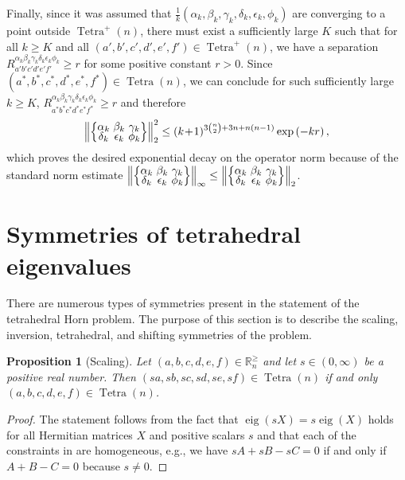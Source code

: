 \documentclass[notitlepage, 11pt, letterpaper]{amsart}
\theoremstyle{plain}
\newtheorem{prop}[thm]{Proposition}
\theoremstyle{definition}
\let\cref\crtcref
\DeclareMathOperator{\Tetra}{Tetra}
\DeclareMathOperator{\eig}{eig}
\newcommand{\polyk}[1]{(k\!+\!1)^{#1}}
\newcommand{\norm}[1]{\left\lVert#1\right\rVert}
\newcommand{\eigs}[1]{\mathbb R^{\geq}_{#1}}
\newcommand{\ea}{a}
\newcommand{\eb}{b}
\newcommand{\ec}{c}
\newcommand{\ed}{d}
\newcommand{\ee}{e}
\newcommand{\ef}{f}
\newcommand{\ya}{\alpha}
\newcommand{\yb}{\beta}
\newcommand{\yc}{\gamma}
\newcommand{\yd}{\delta}
\newcommand{\ye}{\epsilon}
\newcommand{\yf}{\phi}
\newcommand{\tightcurlysixj}[1]{
\begingroup
\arraycolsep=1.5pt
\renewcommand{\arraystretch}{0.3}
\left\{\!\begin{array}{ccc}
    #1
\end{array}\!\right\}
\endgroup
}
\newcommand{\abcdefsymbolk}{\tightcurlysixj{\alpha_k & \beta_k & \gamma_k \\ \delta_k & \epsilon_k & \phi_k}}
\begin{document}
Finally, since it was assumed that $\frac{1}{k}(\ya_k,\yb_k,\yc_k,\yd_k,\ye_k,\yf_k)$ are converging to a point outside $\Tetra^{+}(n)$, there must exist a sufficiently large $K$ such that for all $k \geq K$ and all $(\ea',\eb',\ec',\ed',\ee',\ef') \in \Tetra^{+}(n)$, we have a separation $R_{\ea'\eb'\ec'\ed'\ee'\ef'}^{\ya_k\yb_k\yc_k\yd_k\ye_k\yf_k} \geq r$ for some positive constant $r > 0$.
Since $(\ea^{*},\eb^{*},\ec^{*},\ed^{*},\ee^{*},\ef^{*}) \in \Tetra(n)$, we can conclude for such sufficiently large $k \geq K$, $R_{\ea^{*}\eb^{*}\ec^{*}\ed^{*}\ee^{*}\ef^{*}}^{\ya_k\yb_k\yc_k\yd_k\ye_k\yf_k} \geq r$ and therefore
\begin{equation}
    \norm{\abcdefsymbolk}_{2}^{2} \leq \polyk{3\binom{n}{2}+3n + n(n-1)}  \exp\left( - k r\right),
\end{equation}
which proves the desired exponential decay on the operator norm because of the standard norm estimate $\norm{\abcdefsymbolk}_{\infty} \leq \norm{\abcdefsymbolk}_{2}$.

\appendix

\section{Symmetries of tetrahedral eigenvalues}
\label{sec:symmetries}

There are numerous types of symmetries present in the statement of the tetrahedral Horn problem.
The purpose of this section is to describe the scaling, inversion, tetrahedral, and shifting symmetries of the problem.

\begin{prop}[Scaling]
    \label{prop:scaling}
    Let $(\ea, \eb, \ec, \ed, \ee, \ef) \in \eigs{n}$ and let $s \in (0, \infty)$ be a positive real number.
    Then $(s\ea, s\eb, s\ec, s\ed, s\ee, s\ef) \in \Tetra(n)$ if and only $(\ea, \eb, \ec, \ed, \ee, \ef) \in \Tetra(n)$.
\end{prop}
\begin{proof}
    The statement follows from the fact that $\eig(s X) = s \eig(X)$ holds for all Hermitian matrices $X$ and positive scalars $s$ and that each of the constraints in \cref{eq:tet_cond} are homogeneous, e.g., we have $sA+sB-sC=0$ if and only if $A+B-C=0$ because $s \neq 0$.
\end{proof}
\end{document}
